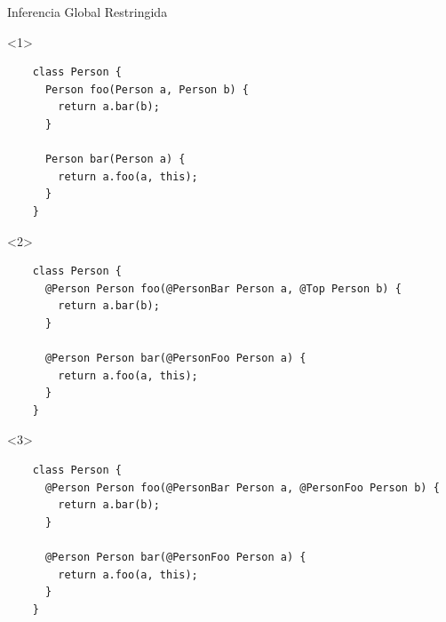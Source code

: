 \documentclass[aspectratio=169,10pt]{beamer}
\begin{document}
\begin{frame}[fragile]{Inferencia Global Restringida}

  \begin{onlyenv}<1>
		\only<2-|handout:0>{\stepcounter{framenumber}}
    \begin{lstlisting}
    class Person {
      Person foo(Person a, Person b) {
        return a.bar(b);
      }

      Person bar(Person a) {
        return a.foo(a, this);
      }
    }
    \end{lstlisting}
  \end{onlyenv}
  \begin{onlyenv}<2>
    \begin{lstlisting}
    class Person {
      @Person Person foo(@PersonBar Person a, @Top Person b) {
        return a.bar(b);
      }

      @Person Person bar(@PersonFoo Person a) {
        return a.foo(a, this);
      }
    }
    \end{lstlisting}
  \end{onlyenv}
    \begin{onlyenv}<3>
    \begin{lstlisting}
    class Person {
      @Person Person foo(@PersonBar Person a, @PersonFoo Person b) {
        return a.bar(b);
      }

      @Person Person bar(@PersonFoo Person a) {
        return a.foo(a, this);
      }
    }
    \end{lstlisting}
  \end{onlyenv}
\end{frame}
\end{document}
